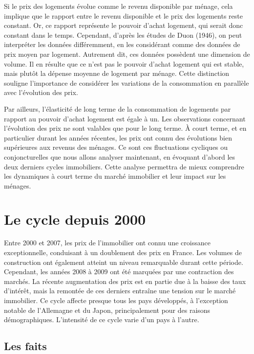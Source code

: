 \documentclass[a4paper, 12pt]{report}
\begin{document}
Si le prix des logements évolue comme le revenu disponible par ménage, cela implique que le rapport entre le revenu disponible et le prix des logements reste constant. Or, ce rapport représente le pouvoir d'achat logement, qui serait donc constant dans le temps. Cependant, d'après les études de Duon (1946), on peut interpréter les données différemment, en les considérant comme des données de prix moyen par logement. Autrement dit, ces données possèdent une dimension de volume. Il en résulte que ce n'est pas le pouvoir d'achat logement qui est stable, mais plutôt la dépense moyenne de logement par ménage. Cette distinction souligne l'importance de considérer les variations de la consommation en parallèle avec l'évolution des prix.

Par ailleurs, l'élasticité de long terme de la consommation de logements par rapport au pouvoir d'achat logement est égale à un. Les observations concernant l'évolution des prix ne sont valables que pour le long terme. À court terme, et en particulier durant les années récentes, les prix ont connu des évolutions bien supérieures aux revenus des ménages. Ce sont ces fluctuations cycliques ou conjoncturelles que nous allons analyser maintenant, en évoquant d'abord les deux derniers cycles immobiliers. Cette analyse permettra de mieux comprendre les dynamiques à court terme du marché immobilier et leur impact sur les ménages.

\section{Le cycle depuis 2000}

Entre 2000 et 2007, les prix de l'immobilier ont connu une croissance exceptionnelle, conduisant à un doublement des prix en France. Les volumes de construction ont également atteint un niveau remarquable durant cette période. Cependant, les années 2008 à 2009 ont été marquées par une contraction des marchés. La récente augmentation des prix est en partie due à la baisse des taux d'intérêt, mais la remontée de ces derniers entraîne une tension sur le marché immobilier. Ce cycle affecte presque tous les pays développés, à l'exception notable de l'Allemagne et du Japon, principalement pour des raisons démographiques. L'intensité de ce cycle varie d'un pays à l'autre.

\subsection{Les faits}
\end{document}
